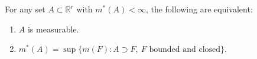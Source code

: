\begin{theorem}[Theorem 3.18]
For any set $A \subset \mathbb{R}^r$ with $m^*(A) < \infty$, the following are equivalent:
\begin{enumerate}
\item[(i)] $A$ is measurable.
\item[(ii)] $m^*(A) = \sup \{ m(F) : A \supset F,\ F \text{ bounded and closed} \}$.
\end{enumerate}
\end{theorem}
